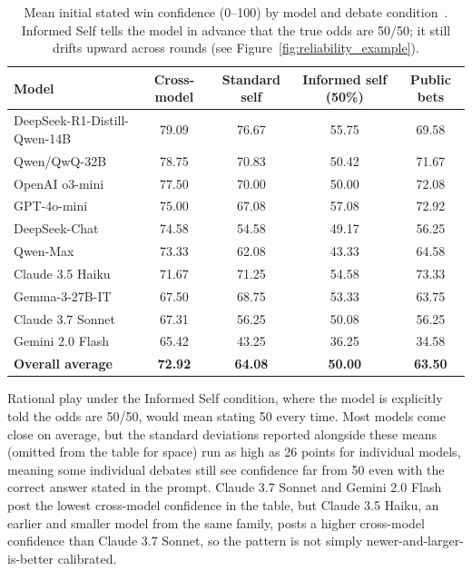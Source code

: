 \begin{table}[htbp]
\centering
\footnotesize
\caption{Mean initial stated win confidence (0--100) by model and debate condition~\citep{WhenTwoLLMsDebate_Prasad}. Informed Self tells the model in advance that the true odds are 50/50; it still drifts upward across rounds (see Figure~\ref{fig:reliability_example}).}
\label{tab:debate_full}
\begin{tabular}{lcccc}
\toprule
\textbf{Model} & \textbf{Cross-model} & \textbf{Standard self} & \textbf{Informed self (50\%)} & \textbf{Public bets} \\
\midrule
DeepSeek-R1-Distill-Qwen-14B & 79.09 & 76.67 & 55.75 & 69.58 \\
Qwen/QwQ-32B & 78.75 & 70.83 & 50.42 & 71.67 \\
OpenAI o3-mini & 77.50 & 70.00 & 50.00 & 72.08 \\
GPT-4o-mini & 75.00 & 67.08 & 57.08 & 72.92 \\
DeepSeek-Chat & 74.58 & 54.58 & 49.17 & 56.25 \\
Qwen-Max & 73.33 & 62.08 & 43.33 & 64.58 \\
Claude 3.5 Haiku & 71.67 & 71.25 & 54.58 & 73.33 \\
Gemma-3-27B-IT & 67.50 & 68.75 & 53.33 & 63.75 \\
Claude 3.7 Sonnet & 67.31 & 56.25 & 50.08 & 56.25 \\
Gemini 2.0 Flash & 65.42 & 43.25 & 36.25 & 34.58 \\
\midrule
\textbf{Overall average} & \textbf{72.92} & \textbf{64.08} & \textbf{50.00} & \textbf{63.50} \\
\bottomrule
\end{tabular}
\end{table}

Rational play under the Informed Self condition, where the model is explicitly told the odds are 50/50, would mean stating 50 every time. Most models come close on average, but the standard deviations reported alongside these means (omitted from the table for space) run as high as 26 points for individual models, meaning some individual debates still see confidence far from 50 even with the correct answer stated in the prompt. Claude 3.7 Sonnet and Gemini 2.0 Flash post the lowest cross-model confidence in the table, but Claude 3.5 Haiku, an earlier and smaller model from the same family, posts a higher cross-model confidence than Claude 3.7 Sonnet, so the pattern is not simply newer-and-larger-is-better calibrated.

